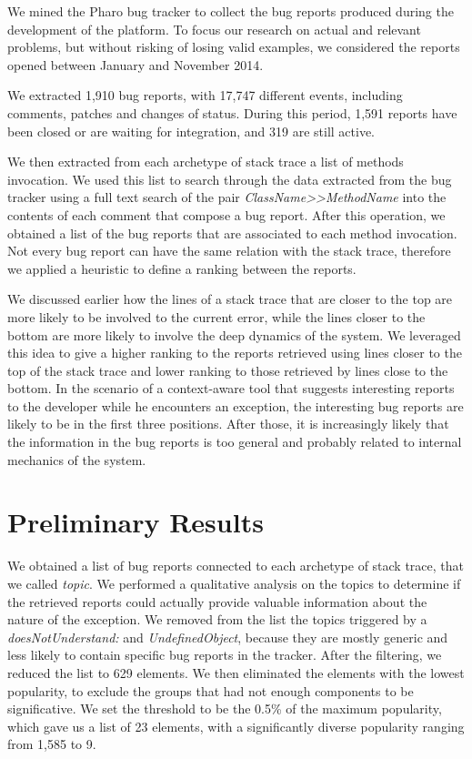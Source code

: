 We mined the Pharo bug tracker to collect the bug reports produced during the development of the platform. To focus our research on actual and relevant problems, but without risking of losing valid examples, we considered the reports opened between January and November 2014. 

We extracted 1,910 bug reports, with 17,747 different events, including comments, patches and changes of status. During this period, 1,591 reports have been closed or are waiting for integration, and 319 are still active.
 
We then extracted from each archetype of stack trace a list of methods invocation. We used this list to search through the data extracted from the bug tracker using a full text search of the pair \emph{ClassName{>}{>}MethodName} into the contents of each comment that compose a bug report. After this operation, we obtained a list of the bug reports that are associated to each method invocation. Not every bug report can have the same relation with the stack trace, therefore we applied a heuristic to define a ranking between the reports. 

We discussed earlier how the lines of a stack trace that are closer to the top are more likely to be involved to the current error, while the lines closer to the bottom are more likely to involve the deep dynamics of the system. We leveraged this idea to give a higher ranking to the reports retrieved using lines closer to the top of the stack trace and lower ranking to those retrieved by lines close to the bottom. In the scenario of a context-aware tool that suggests interesting reports to the developer while he encounters an exception, the interesting bug reports are likely to be in the first three positions. After those, it is increasingly likely that the information in the bug reports is too general and probably related to internal mechanics of the system.



\section{Preliminary Results}\label{sec:evaluation}

We obtained a list of bug reports connected to each archetype of stack trace, that we called \emph{topic}. We performed a qualitative analysis on the topics to determine if the retrieved reports could actually provide valuable information about the nature of the exception. We removed from the list the topics triggered by a \emph{doesNotUnderstand:} and \emph{UndefinedObject}, because they are mostly generic and less likely to contain specific bug reports in the tracker. After the filtering, we reduced the list to 629 elements. We then eliminated the elements with the lowest popularity, to exclude the groups that had not enough components to be significative. We set the threshold to be the 0.5\% of the maximum popularity, which gave us a list of 23 elements, with a significantly diverse popularity ranging from 1,585 to 9. 

